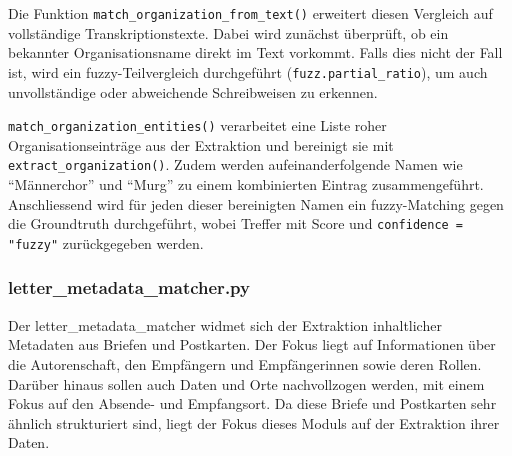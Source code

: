\documentclass[12pt, a4paper, ngerman, bidi=default]{article}
\newcommand{\code}[1]{\colorbox{VeryLightGray}{\texttt{#1}}} %
\begin{document}
Die Funktion \code{match\_organization\_from\_text()} erweitert diesen Vergleich auf vollständige Transkriptionstexte. Dabei wird zunächst überprüft, ob ein bekannter Organisationsname direkt im Text vorkommt. Falls dies nicht der Fall ist, wird ein fuzzy-Teilvergleich durchgeführt (\code{fuzz.partial\_ratio}), um auch unvollständige oder abweichende Schreibweisen zu erkennen.

\code{match\_organization\_entities()} verarbeitet eine Liste roher Organisationseinträge aus der Extraktion und bereinigt sie mit \code{extract\_organization()}. Zudem werden aufeinanderfolgende Namen wie \enquote{Männerchor} und \enquote{Murg} zu einem kombinierten Eintrag zusammengeführt. Anschliessend wird für jeden dieser bereinigten Namen ein fuzzy-Matching gegen die Groundtruth durchgeführt, wobei Treffer mit Score und \code{confidence = "fuzzy"} zurückgegeben werden.

\subsubsection{letter\_metadata\_matcher.py}\label{subsection:letter_metadata_matcher}

Der letter\_metadata\_matcher widmet sich der Extraktion inhaltlicher Metadaten aus Briefen und Postkarten. Der Fokus liegt auf Informationen über die Autorenschaft, den Empfängern und Empfängerinnen sowie deren Rollen. Darüber hinaus sollen auch Daten und Orte nachvollzogen werden, mit einem Fokus auf den Absende- und Empfangsort. Da diese Briefe und Postkarten sehr ähnlich strukturiert sind, liegt der Fokus dieses Moduls auf der Extraktion ihrer Daten.
\end{document}
